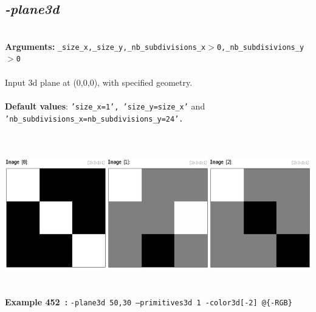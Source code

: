 \documentclass[a4paper,11pt,twoside]{book}
\begin{document}
\subsection{\emph{-plane3d} }\vspace*{-0.5em}
~\\\textbf{Arguments: } 
{\small \texttt{\_size\_x,\_size\_y,\_nb\_subdivisions\_x$>$0,\_nb\_subdisivions\_y$>$0}}\\~\\
Input 3d plane at (0,0,0), with specified geometry.
~\\~\\\textbf{Default values}: {\small \texttt{'size\_x=1', 'size\_y=size\_x'} and \texttt{'nb\_subdivisions\_x=nb\_subdivisions\_y=24'.}}
\begin{center}\includegraphics[keepaspectratio=true,height=7cm,width=\textwidth]{img/gmic_def452.jpg}\\
{\footnotesize \textbf{Example 452~:} \texttt{-plane3d 50,30 --primitives3d 1 -color3d[-2] @\{-RGB\}}}
\end{center}
\end{document}

